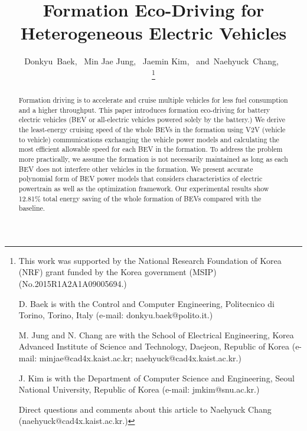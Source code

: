 \documentclass{IEEEtran}
\begin{document}
\title{Formation Eco-Driving for Heterogeneous Electric Vehicles}

\author{
Donkyu~Baek,~  
Min Jae Jung,~
Jaemin Kim,~
and~Naehyuck~Chang,~

\thanks{
This work was supported by the National Research Foundation of Korea (NRF) grant funded by the Korea government (MSIP) (No.2015R1A2A1A09005694.) 

D. Baek is with the Control and Computer Engineering, Politecnico di Torino, Torino, Italy (e-mail: donkyu.baek@polito.it.)

M. Jung and N. Chang are with the School of Electrical Engineering, Korea Advanced Institute of Science and Technology, Daejeon, Republic of Korea (e-mail: minjae@cad4x.kaist.ac.kr; naehyuck@cad4x.kaist.ac.kr.)

J. Kim is with the Department of Computer Science and Engineering, Seoul National University, Republic of Korea (e-mail: jmkim@snu.ac.kr.)

Direct questions and comments about this article to Naehyuck Chang (naehyuck@cad4x.kaist.ac.kr.)}
}

\maketitle

\begin{abstract}
Formation driving is to accelerate and cruise multiple vehicles for less fuel consumption and a higher throughput. This paper introduces formation eco-driving for battery electric vehicles (BEV or all-electric vehicles powered solely by the battery.) We derive the least-energy cruising speed of the whole BEVs in the formation using V2V (vehicle to vehicle) communications exchanging the vehicle power models and calculating the most efficient allowable speed for each BEV in the formation. 
To address the problem more practically, we assume the formation is not necessarily maintained as long as each BEV does not interfere other vehicles in the formation. We present accurate polynomial form of BEV power models that considers characteristics of electric powertrain as well as the optimization framework. Our experimental results show 12.81\% total energy saving of the whole formation of BEVs compared with the baseline. 
\end{abstract}
\end{document}
